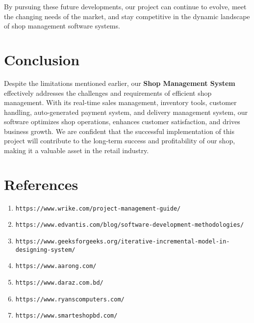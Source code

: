 By pursuing these future developments, our project can continue to evolve, meet the changing needs of the market, and stay competitive in the dynamic landscape of shop management software systems.\\[1ex]

\section{Conclusion}


Despite the limitations mentioned earlier, our \textbf{Shop Management System} effectively addresses the challenges and requirements of efficient shop management. With its real-time sales management, inventory tools, customer handling, auto-generated payment system, and delivery management system, our software optimizes shop operations, enhances customer satisfaction, and drives business growth. We are confident that the successful implementation of this project will contribute to the long-term success and profitability of our shop, making it a valuable asset in the retail industry.

\vspace{8cm}
\section{References}
\begin{enumerate}
    \setlength{\itemsep}{0pt}
    \setlength{\parskip}{0pt}
    \setlength{\parsep}{0pt}
    \item\texttt{https://www.wrike.com/project-management-guide/}
    \item\texttt{https://www.edvantis.com/blog/software-development-methodologies/}
    \item\texttt{https://www.geeksforgeeks.org/iterative-incremental-model-in-designing-system/}
    \item\texttt{https://www.aarong.com/}
    \item\texttt{https://www.daraz.com.bd/}   
    \item\texttt{https://www.ryanscomputers.com/}
    \item \texttt{https://www.smarteshopbd.com/}
\end{enumerate}